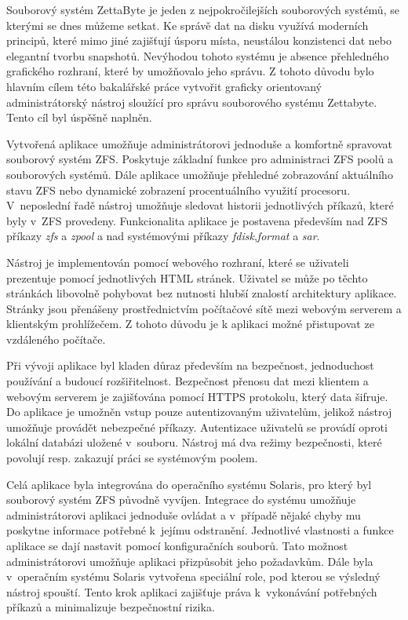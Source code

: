 Souborový systém ZettaByte je jeden z nejpokročilejších souborových systémů, se kterými se dnes můžeme setkat. Ke správě dat na disku využívá moderních principů, které mimo jiné zajišťují úsporu místa, neustálou konzistenci dat nebo elegantní tvorbu snapshotů. Nevýhodou tohoto systému je absence přehledného grafického rozhraní, které by umožňovalo jeho správu. Z tohoto důvodu bylo hlavním cílem této bakalářské práce vytvořit graficky orientovaný administrátorský nástroj sloužící pro správu souborového systému Zettabyte. Tento cíl byl úspěšně naplněn.

Vytvořená aplikace umožňuje administrátorovi jednoduše a komfortně spravovat souborový systém ZFS. Poskytuje základní funkce pro administraci ZFS poolů a souborových systémů. Dále aplikace umožňuje přehledné zobrazování aktuálního stavu ZFS nebo dynamické zobrazení procentuálního využití procesoru. V~neposlední řadě nástroj umožňuje sledovat historii jednotlivých příkazů, které byly v~ZFS provedeny. Funkcionalita aplikace je postavena především nad ZFS příkazy \emph{zfs} a \emph{zpool} a nad systémovými příkazy \emph{fdisk},\emph{format} a \emph{sar}.

Nástroj je implementován pomocí webového rozhraní, které se uživateli prezentuje pomocí jednotlivých HTML stránek. Uživatel se může po těchto stránkách libovolně pohybovat bez nutnosti hlubší znalostí architektury aplikace. Stránky jsou přenášeny prostřednictvím počítačové sítě mezi webovým serverem a klientským prohlížečem. Z tohoto důvodu je k aplikaci možné přistupovat ze vzdáleného počítače.

Při vývoji aplikace byl kladen důraz především na bezpečnost, jednoduchost používání a budoucí rozšiřitelnost. Bezpečnost přenosu dat mezi klientem a webovým serverem je zajišťována pomocí HTTPS protokolu, který data šifruje. Do aplikace je umožněn vstup pouze autentizovaným uživatelům, jelikož nástroj umožňuje provádět nebezpečné příkazy. Autentizace uživatelů se provádí oproti lokální databázi uložené v~souboru. Nástroj má dva režimy bezpečnosti, které povolují resp. zakazují práci se systémovým poolem.

Celá aplikace byla integrována do operačního systému Solaris, pro který byl souborový systém ZFS původně vyvíjen. Integrace do systému umožňuje administrátorovi aplikaci jednoduše ovládat a v~případě nějaké chyby mu poskytne informace potřebné k~jejímu odstranění. Jednotlivé vlastnosti a funkce aplikace se dají nastavit pomocí konfiguračních souborů. Tato možnost administrátorovi umožňuje aplikaci přizpůsobit jeho požadavkům. Dále byla v~operačním systému Solaris vytvořena speciální role, pod kterou se výsledný nástroj spouští. Tento krok aplikaci zajišťuje práva k~vykonávání potřebných příkazů a minimalizuje bezpečnostní rizika.

